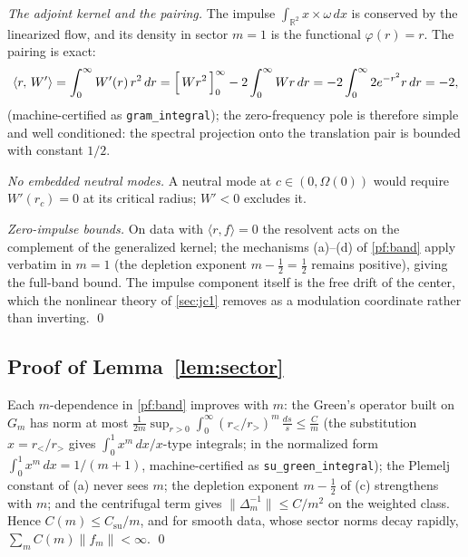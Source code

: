 \documentclass[11pt,letterpaper]{amsart}
\theoremstyle{definition}
\theoremstyle{remark}
\newcommand{\RR}{\mathbb{R}}
\newcommand{\om}{\omega}
\newcommand{\norm}[1]{\lVert #1 \rVert}
\begin{document}
\emph{The adjoint kernel and the pairing.} The impulse
$\int_{\RR^2}x\times\om\,dx$ is conserved by the linearized flow, and its density in
sector $m=1$ is the functional $\varphi(r)=r$. The pairing is exact:
\[
\langle r,\,W'\rangle=\int_0^\infty W'(r)\,r^2\,dr
=\Bigl[\,W r^2\,\Bigr]_0^\infty-2\int_0^\infty W r\,dr
=-2\int_0^\infty 2e^{-r^2}r\,dr=-2 ,
\]
(machine-certified as \texttt{gram\_integral}); the zero-frequency pole is therefore
simple and well conditioned: the spectral projection onto the translation pair is
bounded with constant $1/2$.

\emph{No embedded neutral modes.} A neutral mode at $c\in(0,\Omega(0))$ would require
$W'(r_c)=0$ at its critical radius; $W'<0$ excludes it.

\emph{Zero-impulse bounds.} On data with $\langle r,f\rangle=0$ the resolvent acts on
the complement of the generalized kernel; the mechanisms (a)--(d) of
\cref{pf:band} apply verbatim in $m=1$ (the depletion exponent $m-\tfrac12=\tfrac12$
remains positive), giving the full-band bound. The impulse component itself is the
free drift of the center, which the nonlinear theory of \cref{sec:jc1} removes as a
modulation coordinate rather than inverting. \qed

\subsection{Proof of Lemma~\ref{lem:sector}}\label{pf:sector}
Each $m$-dependence in \cref{pf:band} improves with $m$: the Green's operator built on
$G_m$ has norm at most
$\tfrac{1}{2m}\sup_{r>0}\int_0^\infty(r_</r_>)^m\,\tfrac{ds}{s}\le\tfrac{C}{m}$
(the substitution $x=r_</r_>$ gives $\int_0^1x^{m}\,dx/x$-type integrals;
in the normalized form $\int_0^1x^m\,dx=1/(m+1)$, machine-certified as
\texttt{su\_green\_integral}); the Plemelj constant of (a) never sees $m$; the
depletion exponent $m-\tfrac12$ of (c) strengthens with $m$; and the centrifugal term
gives $\norm{\Delta_m^{-1}}\le C/m^2$ on the weighted class. Hence
$C(m)\le C_{\mathrm{su}}/m$, and for smooth data, whose sector norms decay rapidly,
$\sum_m C(m)\norm{f_m}<\infty$. \qed
\end{document}
